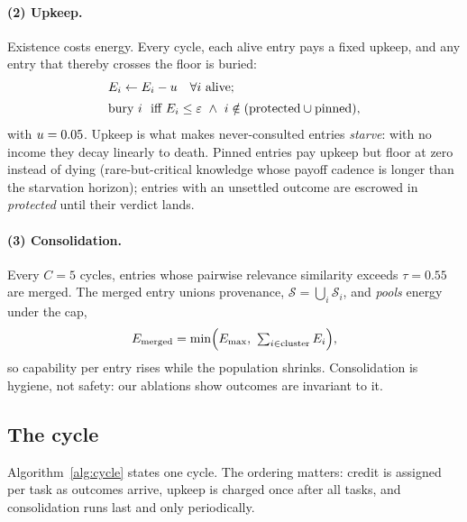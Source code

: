 \paragraph{(2) Upkeep.}
Existence costs energy. Every cycle, each alive entry pays a fixed
upkeep, and any entry that thereby crosses the floor is buried:
\begin{equation}
  \begin{aligned}
    &E_i \leftarrow E_i - \upkeep \quad \forall i \ \text{alive};\\[2pt]
    &\text{bury } i \ \text{ iff } E_i \le \varepsilon
      \ \wedge\ i \notin (\text{protected} \cup \text{pinned}),
  \end{aligned}
  \label{eq:upkeep}
\end{equation}
with $u = 0.05$. Upkeep is what makes never-consulted entries
\emph{starve}: with no income they decay linearly to death. Pinned
entries pay upkeep but floor at zero instead of dying (rare-but-critical
knowledge whose payoff cadence is longer than the starvation horizon);
entries with an unsettled outcome are escrowed in \emph{protected} until
their verdict lands.

\paragraph{(3) Consolidation.}
Every $C = 5$ cycles, entries whose pairwise relevance similarity exceeds
$\tau = 0.55$ are merged. The merged entry unions provenance,
$\mathcal{S} = \bigcup_{i}\mathcal{S}_i$, and \emph{pools} energy under
the cap,
\begin{equation}
  E_{\text{merged}} = \min\!\Big(\Emax,\ \textstyle\sum_{i \in \text{cluster}} E_i\Big),
  \label{eq:merge}
\end{equation}
so capability per entry rises while the population shrinks. Consolidation
is hygiene, not safety: our ablations show outcomes are invariant to it.

\subsection{The cycle}
Algorithm~\ref{alg:cycle} states one cycle. The ordering matters: credit
is assigned per task as outcomes arrive, upkeep is charged once after all
tasks, and consolidation runs last and only periodically.

